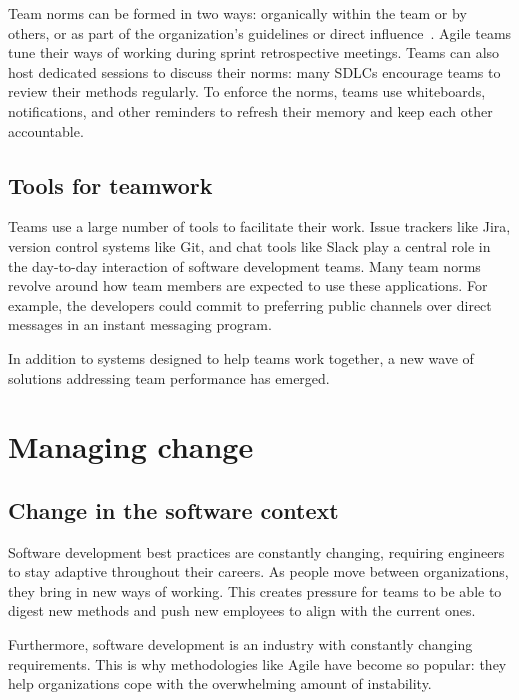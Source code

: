 Team norms can be formed in two ways: organically within the team or by others, or as part of the organization's guidelines or direct influence~\cite{teh_social_2012}. Agile teams tune their ways of working during sprint retrospective meetings. Teams can also host dedicated sessions to discuss their norms: many SDLCs encourage teams to review their methods regularly. To enforce the norms, teams use whiteboards, notifications, and other reminders to refresh their memory and keep each other accountable.  

\subsection{Tools for teamwork}

Teams use a large number of tools to facilitate their work. Issue trackers like Jira, version control systems like Git, and chat tools like Slack play a central role in the day-to-day interaction of software development teams. Many team norms revolve around how team members are expected to use these applications. For example, the developers could commit to preferring public channels over direct messages in an instant messaging program.

In addition to systems designed to help teams work together, a new wave of solutions addressing team performance has emerged. 


\section{Managing change}

\subsection{Change in the software context}

Software development best practices are constantly changing, requiring engineers to stay adaptive throughout their careers. As people move between organizations, they bring in new ways of working. This creates pressure for teams to be able to digest new methods and push new employees to align with the current ones. 

Furthermore, software development is an industry with constantly changing requirements. This is why methodologies like Agile have become so popular: they help organizations cope with the overwhelming amount of instability. 

